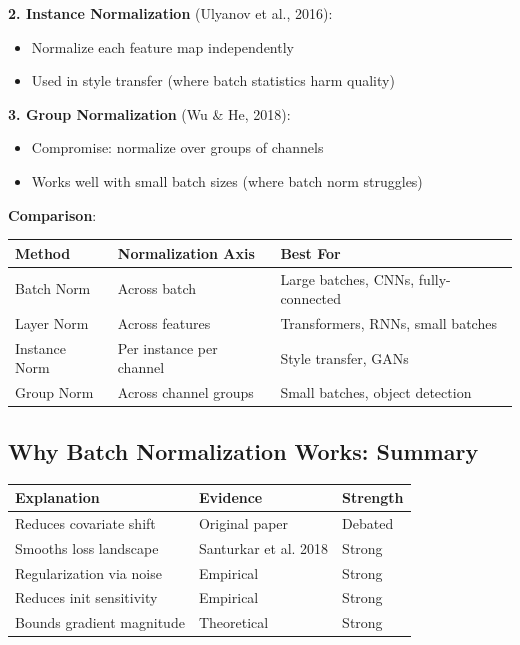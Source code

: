 \documentclass[11pt,oneside]{book}
\begin{document}
\textbf{2. Instance Normalization} (Ulyanov et al., 2016):
\begin{itemize}
\item Normalize each feature map independently
\item Used in style transfer (where batch statistics harm quality)
\end{itemize}

\textbf{3. Group Normalization} (Wu \& He, 2018):
\begin{itemize}
\item Compromise: normalize over groups of channels
\item Works well with small batch sizes (where batch norm struggles)
\end{itemize}

\textbf{Comparison}:

\begin{table}[h]
\centering
\begin{tabular}{lll}
\toprule
\textbf{Method} & \textbf{Normalization Axis} & \textbf{Best For} \\
\midrule
Batch Norm & Across batch & Large batches, CNNs, fully-connected \\
Layer Norm & Across features & Transformers, RNNs, small batches \\
Instance Norm & Per instance per channel & Style transfer, GANs \\
Group Norm & Across channel groups & Small batches, object detection \\
\bottomrule
\end{tabular}
\end{table}

\subsection{Why Batch Normalization Works: Summary}

\begin{table}[h]
\centering
\begin{tabular}{lll}
\toprule
\textbf{Explanation} & \textbf{Evidence} & \textbf{Strength} \\
\midrule
Reduces covariate shift & Original paper & Debated \\
Smooths loss landscape & Santurkar et al. 2018 & Strong \\
Regularization via noise & Empirical & Strong \\
Reduces init sensitivity & Empirical & Strong \\
Bounds gradient magnitude & Theoretical & Strong \\
\bottomrule
\end{tabular}
\end{table}
\end{document}
